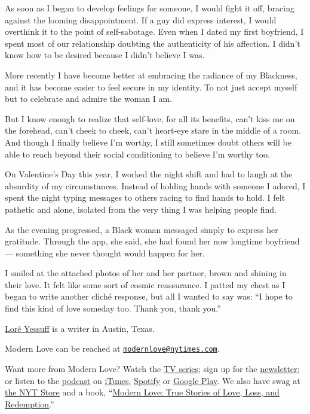 As soon as I began to develop feelings for someone, I would fight it
off, bracing against the looming disappointment. If a guy did express
interest, I would overthink it to the point of self-sabotage. Even when
I dated my first boyfriend, I spent most of our relationship doubting
the authenticity of his affection. I didn't know how to be desired
because I didn't believe I was.

More recently I have become better at embracing the radiance of my
Blackness, and it has become easier to feel secure in my identity. To
not just accept myself but to celebrate and admire the woman I am.

But I know enough to realize that self-love, for all its benefits, can't
kiss me on the forehead, can't cheek to cheek, can't heart-eye stare in
the middle of a room. And though I finally believe I'm worthy, I still
sometimes doubt others will be able to reach beyond their social
conditioning to believe I'm worthy too.

On Valentine's Day this year, I worked the night shift and had to laugh
at the absurdity of my circumstances. Instead of holding hands with
someone I adored, I spent the night typing messages to others racing to
find hands to hold. I felt pathetic and alone, isolated from the very
thing I was helping people find.

As the evening progressed, a Black woman messaged simply to express her
gratitude. Through the app, she said, she had found her now longtime
boyfriend --- something she never thought would happen for her.

I smiled at the attached photos of her and her partner, brown and
shining in their love. It felt like some sort of cosmic reassurance. I
patted my chest as I began to write another cliché response, but all I
wanted to say was: ``I hope to find this kind of love someday too. Thank
you, thank you.''

\href{https://loreyessuff.com/}{Loré Yessuff} is a writer in Austin,
Texas.

Modern Love can be reached at
\href{mailto:modernlove@nytimes.com}{\nolinkurl{modernlove@nytimes.com}}.

Want more from Modern Love? Watch the
\href{https://www.nytimes.com/2019/09/12/style/modern-love-tv-show-trailer.html}{TV
series}; sign up for the
\href{https://www.nytimes.com/newsletters/love-letter}{newsletter}; or
listen to the
\href{https://www.nytimes.com/column/modern-love-podcast}{podcast} on
\href{https://itunes.apple.com/us/podcast/modern-love/id1065559535?mt=2\&version=meter+at+0\&module=meter-Links\&pgtype=article\&contentId=\&mediaId=\&referrer=\&priority=true\&action=click\&contentCollection=meter-links-click}{iTunes},
\href{https://open.spotify.com/show/03Er7mSPq9IEewOgbPD3vO}{Spotify} or
\href{https://play.google.com/music/listen?u=0\#/ps/Iktqjbkz7bychbnofblw32dik64}{Google
Play}. We also have swag at
\href{https://store.nytimes.com/collections/modern-love}{the NYT Store}
and a book,
``\href{https://www.penguinrandomhouse.com/books/623036/modern-love-revised-and-updated-by-edited-by-daniel-jones-with-contributions-by-andrew-rannells-ayelet-waldman-amy-krouse-rosenthal-veronica-chambers-and-more/}{Modern
Love: True Stories of Love, Loss, and Redemption}.''

